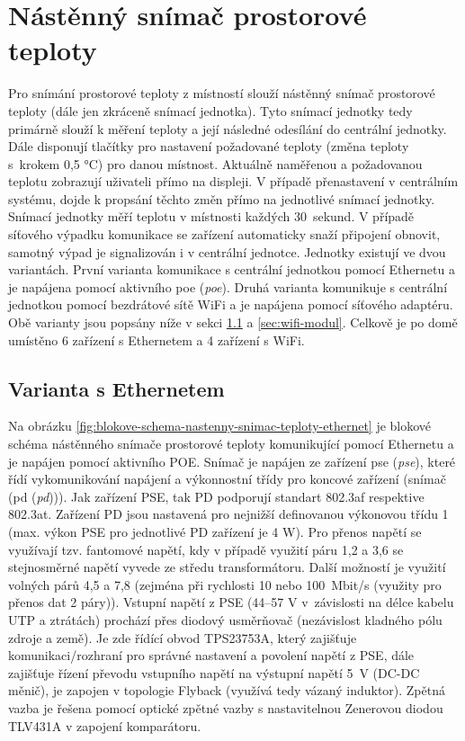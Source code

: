 \section{Nástěnný snímač prostorové teploty}

Pro snímání prostorové teploty z místností slouží nástěnný snímač prostorové teploty (dále jen zkráceně snímací jednotka). Tyto snímací jednotky tedy primárně slouží k měření teploty a její následné odesílání do centrální jednotky. Dále disponují tlačítky pro nastavení požadované teploty (změna teploty s~krokem 0,5 °C) pro danou místnost. Aktuálně naměřenou a požadovanou teplotu zobrazují uživateli přímo na displeji. V případě přenastavení v centrálním systému, dojde k propsání těchto změn přímo na jednotlivé snímací jednotky. Snímací jednotky měří teplotu v místnosti každých 30~sekund. V případě síťového výpadku komunikace se zařízení automaticky snaží připojení obnovit, samotný výpad je signalizován i v centrální jednotce. Jednotky existují ve dvou variantách. První varianta komunikace s centrální jednotkou pomocí Ethernetu a je napájena pomocí aktivního \acrshort{poe} (\textit{\acrlong{poe}}). Druhá varianta komunikuje s centrální jednotkou pomocí bezdrátové sítě WiFi a je napájena pomocí síťového adaptéru. Obě varianty jsou popsány níže v sekci \ref{sec:ethernet-modul} a \ref{sec:wifi-modul}. Celkově je po domě umístěno 6 zařízení s Ethernetem a 4 zařízení s WiFi.

\subsection{Varianta s Ethernetem}
\label{sec:ethernet-modul}

Na obrázku \ref{fig:blokove-schema-nastenny-snimac-teploty-ethernet} je blokové schéma nástěnného snímače prostorové teploty komunikující pomocí Ethernetu a je napájen pomocí aktivního POE. Snímač je napájen ze zařízení \acrshort{pse} (\textit{\acrlong{pse}}), které řídí vykomunikování napájení a výkonnostní třídy pro koncové zařízení (snímač (\acrshort{pd} (\textit{\acrlong{pd}}))). Jak zařízení PSE, tak PD podporují standart 802.3af respektive 802.3at. Zařízení PD jsou nastavená pro nejnižší definovanou výkonovou třídu 1 (max. výkon PSE pro jednotlivé PD zařízení je 4 W). Pro přenos napětí se využívají tzv. fantomové napětí, kdy v případě využití páru 1,2 a 3,6 se stejnosměrné napětí vyvede ze středu transformátoru. Další možností je využití volných párů 4,5 a 7,8 (zejména při rychlosti 10 nebo 100~Mbit/s (využity pro přenos dat 2 páry)). Vstupní napětí z PSE (44–57 V v~závislosti na délce kabelu UTP a ztrátách) prochází přes diodový usměrňovač (nezávislost kladného pólu zdroje a země). Je zde řídící obvod TPS23753A, který zajišťuje komunikaci/rozhraní pro správné nastavení a povolení napětí z PSE, dále zajišťuje řízení převodu vstupního napětí na výstupní napětí 5~V (DC-DC měnič), je zapojen v topologie Flyback (využívá tedy vázaný induktor). Zpětná vazba je řešena pomocí optické zpětné vazby s nastavitelnou Zenerovou diodou TLV431A v zapojení komparátoru. 

